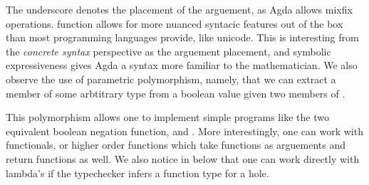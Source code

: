 The underscore denotes the placement of the arguement, as Agda allows mixfix
operations.  function allows for more nuanced syntacic
features out of the box than most programming languages provide, like unicode.
This is interesting from the \emph{concrete syntax} perspective as the arguement
placement, and symbolic expressiveness gives Agda a syntax more familiar to the
mathematician. We also observe the use of parametric polymorphism, namely, that
we can extract a member of some arbtitrary type  from a boolean value
given two members of .

This polymorphism allows one to implement simple programs like the two
equivalent boolean negation function,  and
. More interestingly, one can work with functionals, or
higher order functions which take functions as arguements and return functions
as well. We also notice in  below that one can work
directly with lambda's if the typechecker infers a function type for a hole.

